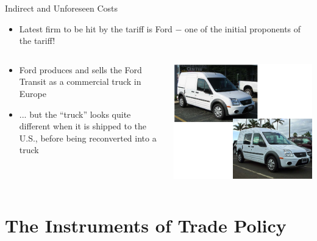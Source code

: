 \documentclass[10pt,hyperref={CJKbookmarks=true},xcolor=dvipsnames,aspectratio=169]{beamer}
\begin{document}
\begin{frame}{Indirect and Unforeseen Costs}

\begin{itemize}
\item Latest firm to be hit by the tariff is Ford − one of the initial proponents
of the tariff!
\end{itemize}

\begin{columns}[onlytextwidth]
\begin{column}{0.5\textwidth}
\begin{itemize}
\item Ford produces and sells the Ford Transit as a commercial truck in
Europe
\item ... but the “truck” looks quite different when it is shipped to the
U.S., before being reconverted into a truck
\end{itemize}

\end{column}
\begin{column}{0.5\textwidth}
\includegraphics[width=\columnwidth]{fig/instruments/lec07-3}
\end{column}
\end{columns}

\end{frame}



\section{The Instruments of Trade Policy}
\end{document}
